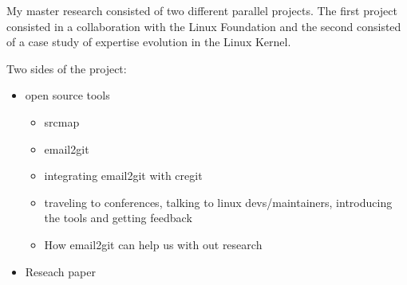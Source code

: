 \label{sec:Theme1}



My master research consisted of two different parallel projects. The first project consisted in a collaboration with the Linux Foundation and the second consisted of a case study of expertise evolution in the Linux Kernel.






Two sides of the project:

\begin{itemize}
\item open source tools	
  \begin{itemize}
	\item srcmap
	\item email2git
	\item integrating email2git with cregit
	\item traveling to conferences, talking to linux devs/maintainers, introducing the tools and getting feedback
	\item How email2git can help us with out research 
  \end{itemize}	
\item Reseach paper 
\end{itemize}